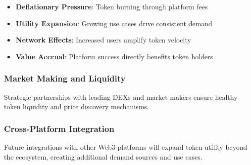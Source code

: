 \begin{itemize}
    \item \textbf{Deflationary Pressure}: Token burning through platform fees
    \item \textbf{Utility Expansion}: Growing use cases drive consistent demand
    \item \textbf{Network Effects}: Increased users amplify token velocity
    \item \textbf{Value Accrual}: Platform success directly benefits token holders
\end{itemize}

\subsubsection{Market Making and Liquidity}

Strategic partnerships with leading DEXs and market makers ensure healthy token liquidity and price discovery mechanisms.

\subsubsection{Cross-Platform Integration}

Future integrations with other Web3 platforms will expand \tip{} token utility beyond the \storyhouse{} ecosystem, creating additional demand sources and use cases.